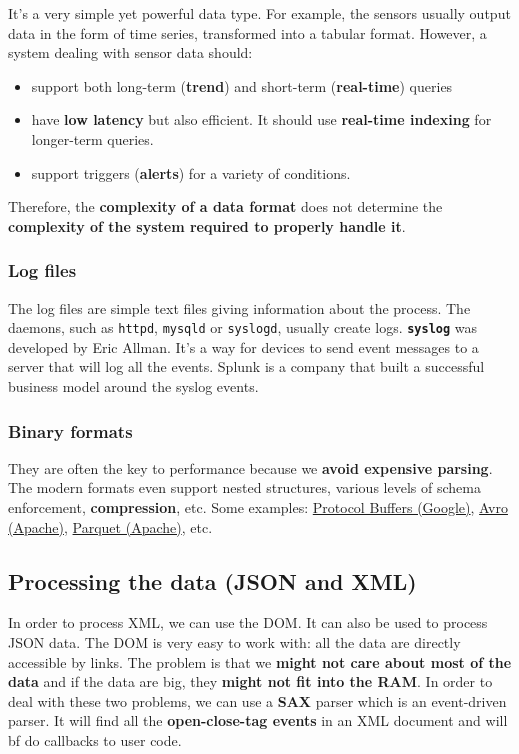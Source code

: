 It's a very simple yet powerful data type. For example, the sensors usually output data in the form of time series, transformed into a tabular format. However, a system dealing with sensor data should:
\begin{itemize}
 \item support both long-term ({\bf trend}) and short-term ({\bf real-time}) queries
 \item have {\bf low latency} but also efficient. It should use {\bf real-time indexing} for longer-term queries.
 \item support triggers ({\bf alerts}) for a variety of conditions.
\end{itemize}
Therefore, the {\bf complexity of a data format} does not determine the {\bf complexity of the system required to properly handle it}.

\subsubsection{Log files}

The log files are simple text files giving information about the process. The daemons, such as \verb+httpd+, \verb+mysqld+ or \verb+syslogd+, usually create logs. {\bf \verb+syslog+} was developed by Eric Allman. It's a way for devices to send event messages to a server that will log all the events. Splunk is a company that built a successful business model around the syslog events.

\subsubsection{Binary formats}

They are often the key to performance because we {\bf avoid expensive parsing}. The modern formats even support nested structures, various levels of schema enforcement, {\bf compression}, etc. Some examples: \href{https://developers.google.com/protocol-buffers/docs/overview}{Protocol Buffers (Google)}, \href{https://avro.apache.org/docs/current/}{Avro (Apache)}, \href{https://parquet.apache.org/documentation/latest/}{Parquet (Apache)}, etc.

\subsection{Processing the data (JSON and XML)}

In order to process XML, we can use the DOM. It can also be used to process JSON data. The DOM is very easy to work with: all the data are directly accessible by links. The problem is that we {\bf might not care about most of the data} and if the data are big, they {\bf might not fit into the RAM}. In order to deal with these two problems, we can use a {\bf SAX} parser which is an event-driven parser. It will find all the {\bf open-close-tag events} in an XML document and will {bf do callbacks to user code}.

